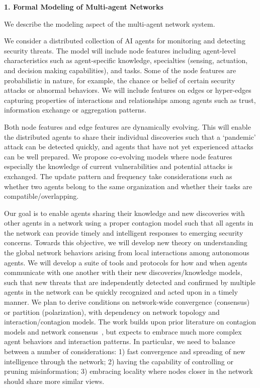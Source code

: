 \documentclass{NSF}
\begin{document}
\noindent \textbf{1. Formal Modeling of Multi-agent Networks}

We describe the modeling aspect of the multi-agent network system.

We consider a distributed collection of AI agents for monitoring and detecting security threats.
The model will include node features including agent-level characteristics such as agent-specific knowledge, specialties (sensing, actuation, and decision making capabilities), and tasks.
Some of the node features are probabilistic in nature, for example, the chance or belief of certain security attacks or abnormal behaviors.
We will include features on edges or hyper-edges capturing properties of interactions and relationships among agents such as trust, information exchange or aggregation patterns.

Both node features and edge features are dynamically evolving.
This will enable the distributed agents to share their individual discoveries such that a `pandemic' attack can be detected quickly, and agents that have not yet experienced attacks can be well prepared.
We propose co-evolving models where node features especially the knowledge of current vulnerabilities and potential attacks is exchanged.
The update pattern and frequency take considerations such as whether two agents belong to the same organization and whether their tasks are compatible/overlapping.

Our goal is to enable agents sharing their knowledge and new discoveries with other agents in a network using a proper contagion model such that all agents in the network can provide timely and intelligent responses to emerging security concerns.
Towards this objective, we will develop new theory on understanding the global network behaviors arising from local interactions among autonomous agents.
We will develop a suite of tools and protocols for how and when agents communicate with one another with their new discoveries/knowledge models, such that new threats that are independently detected and confirmed by multiple agents in the network can be quickly recognized and acted upon in a timely manner.
We plan to derive conditions on network-wide convergence (consensus) or partition (polarization), with dependency on network topology and interaction/contagion models.
The work builds upon prior literature on contagion models and network consensus~\cite{Ghasemiesfeh:2013:CCW,gao2017engineering,ebrahimi17complex,gao19volatility,gao16general,wang22coevolution}, but expects to embrace much more complex agent behaviors and interaction patterns.
In particular, we need to balance between a number of considerations:
1) fast convergence and spreading of new intelligence through the network;
2) having the capability of controlling or pruning misinformation;
3) embracing locality where nodes closer in the network should share more similar views.
\end{document}
